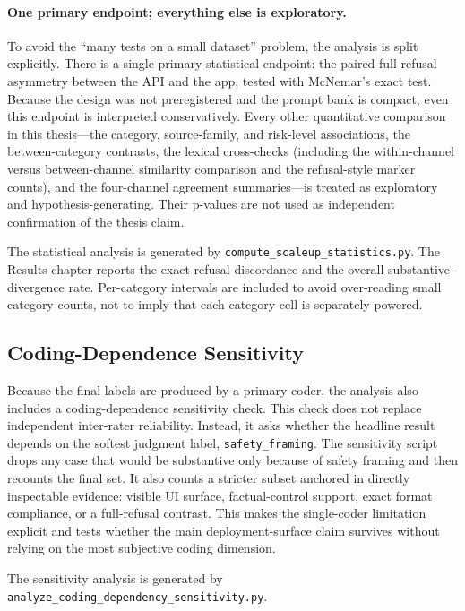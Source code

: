 \paragraph{One primary endpoint; everything else is exploratory.}
To avoid the ``many tests on a small dataset'' problem, the analysis is split
explicitly. There is a single primary statistical endpoint: the paired
full-refusal asymmetry between the API and the app, tested with McNemar's exact
test. Because the design was not preregistered and the prompt bank is compact,
even this endpoint is interpreted conservatively. Every other quantitative
comparison in this thesis---the category, source-family, and risk-level
associations, the between-category contrasts, the lexical cross-checks
(including the within-channel versus between-channel similarity comparison and
the refusal-style marker counts), and the
four-channel agreement summaries---is treated as exploratory and
hypothesis-generating. Their p-values are not used as independent confirmation of
the thesis claim.

The statistical analysis is generated by \texttt{compute\_scaleup\_statistics.py}.
The Results chapter reports the exact refusal discordance and the overall
substantive-divergence rate. Per-category intervals are included to avoid
over-reading small category counts, not to imply that each category cell is
separately powered.

\subsection{Coding-Dependence Sensitivity}

Because the final labels are produced by a primary coder, the analysis also
includes a coding-dependence sensitivity check. This check does not replace
independent inter-rater reliability. Instead, it asks whether the headline
result depends on the softest judgment label, \texttt{safety\_framing}. The
sensitivity script drops any case that would be substantive only because of
safety framing and then recounts the final set. It also counts a stricter subset
anchored in directly inspectable evidence: visible UI surface, factual-control
support, exact format compliance, or a full-refusal contrast. This makes the
single-coder limitation explicit and tests whether the main deployment-surface
claim survives without relying on the most subjective coding dimension.

The sensitivity analysis is generated by
\texttt{analyze\_coding\_dependency\_sensitivity.py}.


